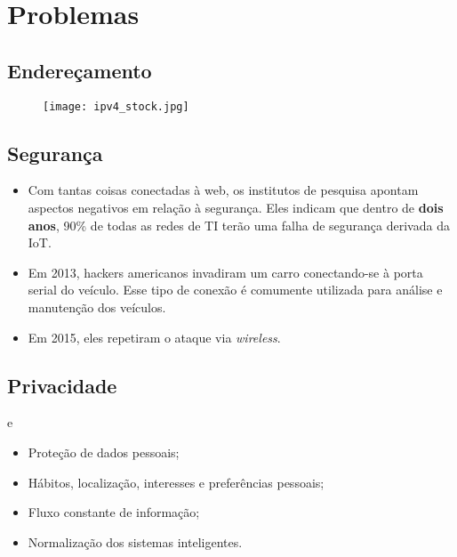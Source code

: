 \section{Problemas}

\subsection*{Endereçamento}
\begin{frame}{}
	\begin{figure}[H]
		\texttt{[image: ipv4\_stock.jpg]}\footnotemark
	\end{figure}
	
\end{frame}

\subsection*{Segurança}
\begin{frame}{}
	\begin{block}{\cite{ComputerWorld}}
		\begin{itemize}
			\item Com tantas coisas conectadas à web, os institutos de pesquisa apontam aspectos negativos em relação à segurança. Eles indicam que dentro de \textbf{dois anos}, 90\% de todas as redes de TI terão uma falha de segurança derivada da IoT.
			\item Em 2013, hackers americanos invadiram um carro conectando-se à porta serial do veículo. Esse tipo de conexão é comumente utilizada para análise e manutenção dos veículos.
			\item Em 2015, eles repetiram o ataque via \textit{wireless}.
		\end{itemize}
	\end{block}
\end{frame}

\subsection*{Privacidade}
\begin{frame}{}
	\begin{block}{\cite{PedroValente} e \cite{P2413}}
		\begin{itemize}
			\item Proteção de dados pessoais;
			\item Hábitos, localização, interesses e preferências pessoais;
			\item Fluxo constante de informação;
			\item Normalização dos sistemas inteligentes.
		\end{itemize}
	\end{block}
\end{frame}

